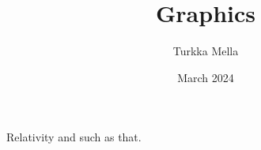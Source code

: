 \documentclass{article}
\title{Graphics}
\author{Turkka Mella}
\date{March 2024}
\begin{document}




\maketitle
\tableofcontents                %


Relativity \cite{einstein2013principle} and such as that.

\appendix



\end{document}
